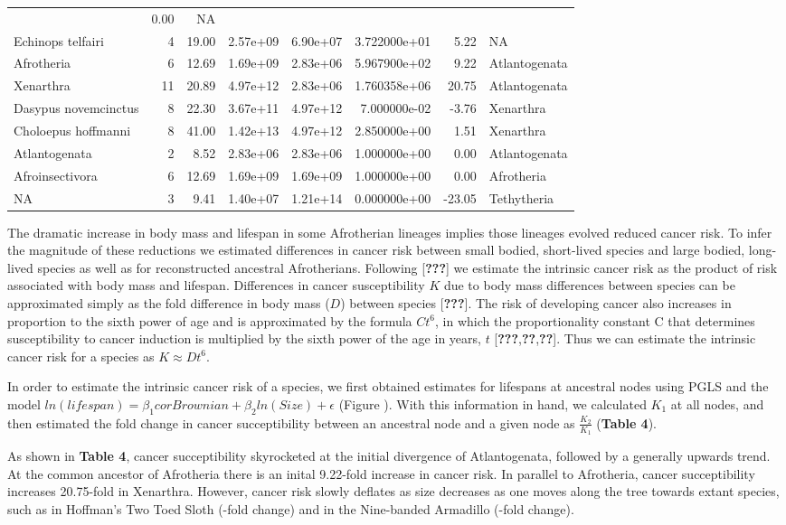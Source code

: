 \documentclass[10pt,letterpaper]{article}
\begin{document}
\begin{longtable}[]{@{}lrrllrrl@{}}
& 0.00 & NA\tabularnewline
Echinops telfairi & 4 & 19.00 & 2.57e+09 & 6.90e+07 & 3.722000e+01 &
5.22 & NA\tabularnewline
Afrotheria & 6 & 12.69 & 1.69e+09 & 2.83e+06 & 5.967900e+02 & 9.22 &
Atlantogenata\tabularnewline
Xenarthra & 11 & 20.89 & 4.97e+12 & 2.83e+06 & 1.760358e+06 & 20.75 &
Atlantogenata\tabularnewline
Dasypus novemcinctus & 8 & 22.30 & 3.67e+11 & 4.97e+12 & 7.000000e-02 &
-3.76 & Xenarthra\tabularnewline
Choloepus hoffmanni & 8 & 41.00 & 1.42e+13 & 4.97e+12 & 2.850000e+00 &
1.51 & Xenarthra\tabularnewline
Atlantogenata & 2 & 8.52 & 2.83e+06 & 2.83e+06 & 1.000000e+00 & 0.00 &
Atlantogenata\tabularnewline
Afroinsectivora & 6 & 12.69 & 1.69e+09 & 1.69e+09 & 1.000000e+00 & 0.00
& Afrotheria\tabularnewline
NA & 3 & 9.41 & 1.40e+07 & 1.21e+14 & 0.000000e+00 & -23.05 &
Tethytheria\tabularnewline
\bottomrule
\end{longtable}

The dramatic increase in body mass and lifespan in some Afrotherian
lineages implies those lineages evolved reduced cancer risk. To infer
the magnitude of these reductions we estimated differences in cancer
risk between small bodied, short-lived species and large bodied,
long-lived species as well as for reconstructed ancestral Afrotherians.
Following {[}{\textbf{???}}{]} we estimate the intrinsic cancer risk as
the product of risk associated with body mass and lifespan. Differences
in cancer susceptibility \(K\) due to body mass differences between
species can be approximated simply as the fold difference in body mass
(\(D\)) between species {[}{\textbf{???}}{]}. The risk of developing
cancer also increases in proportion to the sixth power of age and is
approximated by the formula \(Ct^6\), in which the proportionality
constant C that determines susceptibility to cancer induction is
multiplied by the sixth power of the age in years, \(t\)
{[}{\textbf{???}},{\textbf{??}},{\textbf{??}}{]}. Thus we can estimate
the intrinsic cancer risk for a species as \(K \approx Dt^6\).

In order to estimate the intrinsic cancer risk of a species, we first
obtained estimates for lifespans at ancestral nodes using PGLS and the
model
\(ln(lifespan) = \beta_{1}corBrownian +\beta_{2}ln(Size) + \epsilon\)
(Figure ). With this information in hand, we calculated \(K_{1}\) at all
nodes, and then estimated the fold change in cancer succeptibility
between an ancestral node and a given node as \(\frac{K_{2}}{K_{1}}\)
(\textbf{Table 4}).

As shown in \textbf{Table 4}, cancer succeptibility skyrocketed at the
initial divergence of Atlantogenata, followed by a generally upwards
trend. At the common ancestor of Afrotheria there is an inital 9.22-fold
increase in cancer risk. In parallel to Afrotheria, cancer
succeptibility increases 20.75-fold in Xenarthra. However, cancer risk
slowly deflates as size decreases as one moves along the tree towards
extant species, such as in Hoffman's Two Toed Sloth (-fold change) and
in the Nine-banded Armadillo (-fold change).
\end{document}
